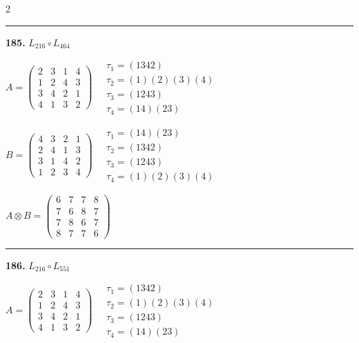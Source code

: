 \begin{multicols}{2}
\vspace{0.3em}
\hrule
\vspace{0.3em}

\noindent\textbf{185.} $L_{216} \circ L_{464}$

$A = \begin{pmatrix} 2 & 3 & 1 & 4 \\ 1 & 2 & 4 & 3 \\ 3 & 4 & 2 & 1 \\ 4 & 1 & 3 & 2 \end{pmatrix} \quad \begin{matrix} \tau_{1}=(1 3 4 2) \\ \tau_{2}=(1)(2)(3)(4) \\ \tau_{3}=(1 2 4 3) \\ \tau_{4}=(1 4)(2 3) \end{matrix}$

$B = \begin{pmatrix} 4 & 3 & 2 & 1 \\ 2 & 4 & 1 & 3 \\ 3 & 1 & 4 & 2 \\ 1 & 2 & 3 & 4 \end{pmatrix} \quad \begin{matrix} \tau_{1}=(1 4)(2 3) \\ \tau_{2}=(1 3 4 2) \\ \tau_{3}=(1 2 4 3) \\ \tau_{4}=(1)(2)(3)(4) \end{matrix}$

$A \otimes B = \begin{pmatrix} 6 & 7 & 7 & 8 \\ 7 & 6 & 8 & 7 \\ 7 & 8 & 6 & 7 \\ 8 & 7 & 7 & 6 \end{pmatrix}$

\vspace{0.3em}
\hrule
\vspace{0.3em}

\noindent\textbf{186.} $L_{216} \circ L_{551}$

$A = \begin{pmatrix} 2 & 3 & 1 & 4 \\ 1 & 2 & 4 & 3 \\ 3 & 4 & 2 & 1 \\ 4 & 1 & 3 & 2 \end{pmatrix} \quad \begin{matrix} \tau_{1}=(1 3 4 2) \\ \tau_{2}=(1)(2)(3)(4) \\ \tau_{3}=(1 2 4 3) \\ \tau_{4}=(1 4)(2 3) \end{matrix}$


\end{multicols}
